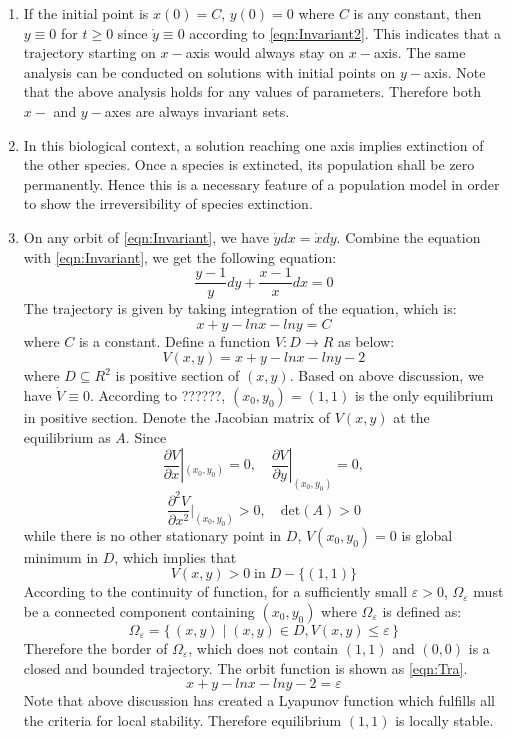 \documentclass[a4paper,twocolumn]{article} %
\begin{document}
\begin{enumerate}
\item If the initial point is $x(0)=C$, $y(0)=0$ where $C$ is any constant, then $y \equiv 0$ for $t \geqslant 0$ since $\dot{y} \equiv 0$ according to \eqref{eqn:Invariant2}. This indicates that a trajectory starting on $x-$axis would always stay on $x-$axis. The same analysis can be conducted on solutions with initial points on $y-$axis. Note that the above analysis holds for any values of parameters. Therefore both $x-$ and $y-$axes are always invariant sets.
\item In this biological context, a solution reaching one axis implies extinction of the other species. Once a species is extincted, its population shall be zero permanently. Hence this is a necessary feature of a population model in order to show the irreversibility of species extinction.
\item On any orbit of \eqref{eqn:Invariant}, we have $\dot{y}dx = \dot{x}dy$. Combine the equation with \eqref{eqn:Invariant}, we get the following equation:
$$\frac{y-1}{y} dy + \frac{x-1}{x} dx = 0$$
The trajectory is given by taking integration of the equation, which is:
$$x+y-lnx-lny=C$$
where $C$ is a constant. Define a function $V:D\to R$  as below:
\begin{equation}\label{fun:Lya}
V(x,y)=x+y-lnx-lny-2
\end{equation}
where $D \subseteq R^2$ is positive section of $(x,y)$. Based on above discussion, we have $\dot{V} \equiv 0$. According to ??????, $(x_0,y_0)=(1,1)$ is the only equilibrium in positive section. Denote the Jacobian matrix of $V(x,y)$ at the equilibrium as $A$. Since 
$$\frac{\partial V}{\partial x}|_{(x_0,y_0)} = 0, \quad \frac{\partial V}{\partial y}|_{(x_0,y_0)} = 0,$$ 
$$\frac{\partial^2 V}{\partial x^2}|_{(x_0,y_0)} > 0, \quad \text{det}(A)>0$$
while there is no other stationary point in $D$, $V(x_0,y_0)=0$ is global minimum in $D$, which implies that 
$$V(x,y)>0\; \text{in}\; D-\{(1,1)\}$$
According to the continuity of function, for a sufficiently small $\varepsilon > 0$, $\Omega_\varepsilon$ must be a connected component containing $(x_0,y_0)$ where $\Omega_\varepsilon$ is defined as:
$$\Omega_\varepsilon=\{\,(x,y) \mid (x,y) \in D, V(x,y) \leqslant \varepsilon\,\}$$
Therefore the border of $\Omega_\varepsilon$, which does not contain $(1,1)$ and $(0,0)$ is a closed and bounded trajectory. The orbit function is shown as \eqref{eqn:Tra}.
 \begin{equation} \label{eqn:Tra}
x+y-lnx-lny-2 = \varepsilon
\end{equation}
Note that above discussion has created a Lyapunov function which fulfills all the criteria for local stability. Therefore equilibrium $(1,1)$ is locally stable.
\end{enumerate}
\end{document}
